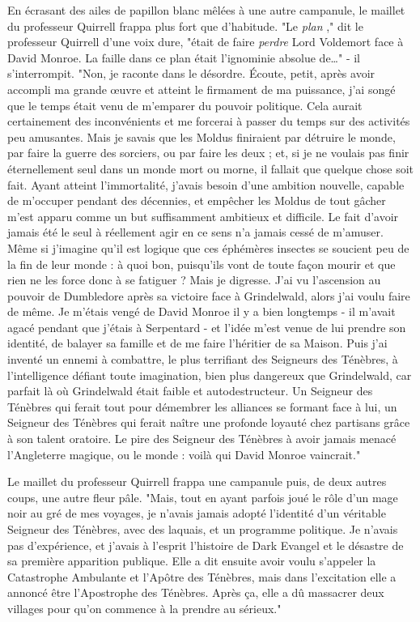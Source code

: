 En écrasant des ailes de papillon blanc mêlées à une autre campanule, le maillet du professeur Quirrell frappa plus fort que d'habitude. "Le \emph{plan} ," dit le professeur Quirrell d'une voix dure, "était de faire \emph{perdre}  Lord Voldemort face à David Monroe. La faille dans ce plan était l'ignominie absolue de…" - il s'interrompit. "Non, je raconte dans le désordre. Écoute, petit, après avoir accompli ma grande œuvre et atteint le firmament de ma puissance, j'ai songé que le temps était venu de m'emparer du pouvoir politique. Cela aurait certainement des inconvénients et me forcerai à passer du temps sur des activités peu amusantes. Mais je savais que les Moldus finiraient par détruire le monde, par faire la guerre des sorciers, ou par faire les deux ; et, si je ne voulais pas finir éternellement seul dans un monde mort ou morne, il fallait que quelque chose soit fait. Ayant atteint l'immortalité, j'avais besoin d'une ambition nouvelle, capable de m'occuper pendant des décennies, et empêcher les Moldus de tout gâcher m'est apparu comme un but suffisamment ambitieux et difficile. Le fait d'avoir jamais été le seul à réellement agir en ce sens n'a jamais cessé de m'amuser. Même si j'imagine qu'il est logique que ces éphémères insectes se soucient peu de la fin de leur monde : à quoi bon, puisqu'ils vont de toute façon mourir et que rien ne les force donc à se fatiguer ? Mais je digresse. J'ai vu l'ascension au pouvoir de Dumbledore après sa victoire face à Grindelwald, alors j'ai voulu faire de même. Je m'étais vengé de David Monroe il y a bien longtemps - il m'avait agacé pendant que j'étais à Serpentard - et l'idée m'est venue de lui prendre son identité, de balayer sa famille et de me faire l'héritier de sa Maison. Puis j'ai inventé un ennemi à combattre, le plus terrifiant des Seigneurs des Ténèbres, à l'intelligence défiant toute imagination, bien plus dangereux que Grindelwald, car parfait là où Grindelwald était faible et autodestructeur. Un Seigneur des Ténèbres qui ferait tout pour démembrer les alliances se formant face à lui, un Seigneur des Ténèbres qui ferait naître une profonde loyauté chez partisans grâce à son talent oratoire. Le pire des Seigneur des Ténèbres à avoir jamais menacé l'Angleterre magique, ou le monde : voilà qui David Monroe vaincrait."

Le maillet du professeur Quirrell frappa une campanule puis, de deux autres coups, une autre fleur pâle. "Mais, tout en ayant parfois joué le rôle d'un mage noir au gré de mes voyages, je n'avais jamais adopté l'identité d'un véritable Seigneur des Ténèbres, avec des laquais, et un programme politique. Je n'avais pas d'expérience, et j'avais à l'esprit l'histoire de Dark Evangel et le désastre de sa première apparition publique. Elle a dit ensuite avoir voulu s'appeler la Catastrophe Ambulante et l'Apôtre des Ténèbres, mais dans l'excitation elle a annoncé être l'Apostrophe des Ténèbres. Après ça, elle a dû massacrer deux villages pour qu'on commence à la prendre au sérieux."

